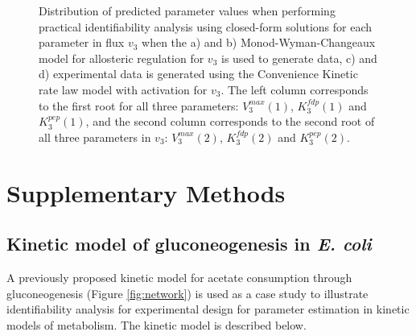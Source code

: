 \documentclass[10pt]{article}
\begin{document}
\begin{figure}[!tbhp]
	\caption{Distribution of predicted parameter values when performing practical identifiability analysis using closed-form solutions for each parameter in flux $v_3$ when the a) and b) Monod-Wyman-Changeaux model for allosteric regulation for $v_3$ is used to generate data, c) and d) experimental data is generated using the Convenience Kinetic rate law model with activation for $v_3$. The left column corresponds to the first root for all three parameters: $V_3^{max}(1)$, $K_3^{fdp}(1)$ and $K_3^{pep}(1)$, and the second column corresponds to the second root of all three parameters in $v_3$: $V_3^{max}(2)$, $K_3^{fdp}(2)$ and $K_3^{pep}(2)$.}\label{fig:parameter_value_v3}
\end{figure}	

\clearpage

\section{Supplementary Methods}
\subsection{Kinetic model of gluconeogenesis in \textit{E. coli}}\label{sec:small-model}
A previously proposed kinetic model \parencite{Kotte2014, Srinivasan2017} for acetate consumption through gluconeogenesis (Figure \ref{fig:network}) is used as a case study to illustrate identifiability analysis for experimental design for parameter estimation in kinetic models of metabolism. The kinetic model is described below.
\end{document}
